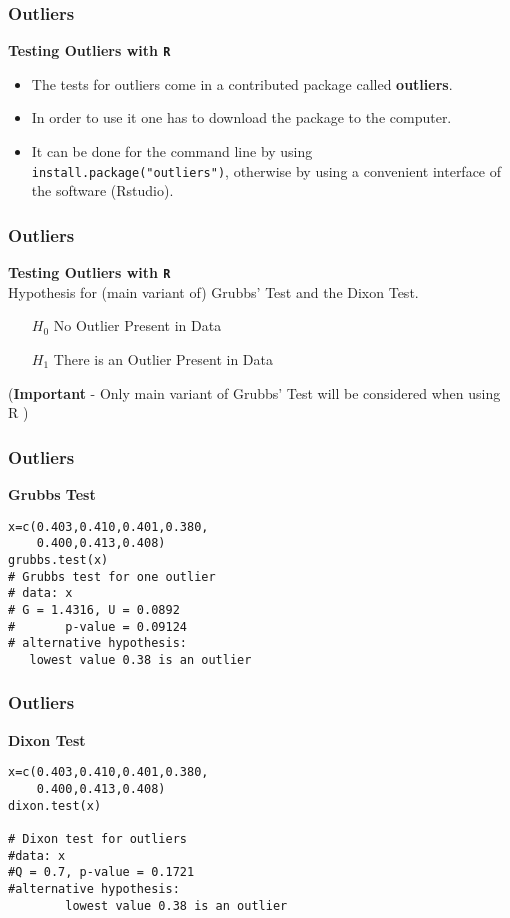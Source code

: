 \documentclass{beamer}
\begin{document}
\begin{frame}[fragile]
\frametitle{Outliers}
\Large
\textbf{Testing Outliers with \texttt{R}}\\
\begin{itemize}
\item The tests for outliers come in a contributed package called
\textbf{outliers}.
\item In order to use it one has to download the package to
the computer. 
\item It can be done for the command line by using
\texttt{install.package("outliers")}, otherwise by using a
convenient interface of the software (Rstudio).
\end{itemize}

\end{frame}
\begin{frame}[fragile]
	\frametitle{Outliers}
	\Large
\textbf{Testing Outliers with \texttt{R}}\\	
  Hypothesis for (main variant of) Grubbs' Test and the Dixon Test.
	
	\begin{itemize}
		\item[$H_0$] No Outlier Present in Data
		\item[$H_1$] There is an Outlier Present in Data
	\end{itemize}
	\bigskip
(\textbf{Important} - Only main variant of Grubbs' Test will be considered when using R )
\end{frame}
\begin{frame}[fragile]
	\frametitle{Outliers}
	\Large
\textbf{Grubbs Test}
	\begin{framed}
\begin{verbatim}
x=c(0.403,0.410,0.401,0.380,
    0.400,0.413,0.408)
grubbs.test(x)
# Grubbs test for one outlier
# data: x
# G = 1.4316, U = 0.0892
#       p-value = 0.09124
# alternative hypothesis: 
   lowest value 0.38 is an outlier
\end{verbatim}
\end{framed}
\end{frame}

\begin{frame}[fragile]
\frametitle{Outliers}
\Large
\textbf{Dixon Test}
\begin{framed}
\begin{verbatim}
x=c(0.403,0.410,0.401,0.380,
    0.400,0.413,0.408)
dixon.test(x)

# Dixon test for outliers
#data: x
#Q = 0.7, p-value = 0.1721
#alternative hypothesis: 
        lowest value 0.38 is an outlier
\end{verbatim}
\end{framed}
\end{frame}
\end{document}
